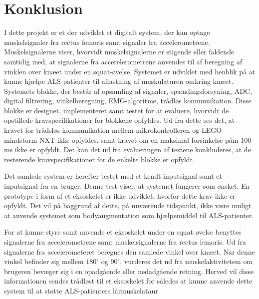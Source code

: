 \section{Konklusion}

I dette projekt er et der udviklet et digitalt system, der kan optage muskelsignaler fra rectus femoris samt signaler fra accelerometrene. Muskelsignalerne viser, hvorvidt muskelsignalerne er stigende eller faldende samtidig med, at signalerne fra accerelerometrene anvendes til af beregning af vinklen over knæet under en squat-øvelse. Systemet er udviklet med henblik på at kunne hjælpe ALS-patienter til aflastning af muskulaturen omkring knæet. Systemets blokke, der består af opsamling af signaler, spændingsforsyning, ADC, digital filtrering, vinkelberegning, EMG-algoritme, trådløs kommunikation. Disse blokke er designet, implementeret samt testet for at evaluere, hvorvidt de opstillede kravspecifikationer for blokkene opfyldes.
Ud fra dette ses det, at kravet for trådsløs kommunikation mellem mikrokontrolleren og LEGO mindstorm NXT ikke opfyldes, samt kravet om en maksimal forsinkelse påm 100 ms ikke er opfyldt. Det kan det ud fra evalueringen af testene konkluderes, at de resterende kravspecifikationer for de enkelte blokke er opfyldt. 

Det samlede system er herefter testet med et kendt inputsignal samt et inputsignal fra en bruger. Denne test viser, at systemet fungerer som ønsket. En prototype i form af et eksoskelet er ikke udviklet, hvorfor dette krav ikke er opfyldt. Det vil på baggrund af dette, på nuværende tidspunkt, ikke være muligt at anvende systemet som bodyaugmentation som hjælpemiddel til ALS-patienter. 

For at kunne styre samt anvende et eksoskelet under en squat øvelse benyttes signalerne fra accelerometrene samt muskelsignalerne fra rectus femoris. Ud fra signalerne fra accelerometeret beregnes den samlede vinkel over knæet. Når denne vinkel befinder sig mellem $180^{\circ}$ og $90^{\circ}$, vurderes det ud fra muskelaktivitetem om brugeren bevæger sig i en opadgående eller nedadgående retning. Herved vil disse informationen sendes trådløst til et eksoskelet for således at kunne anvende dette system til at støtte ALS-patienters lårmuskelataur. 